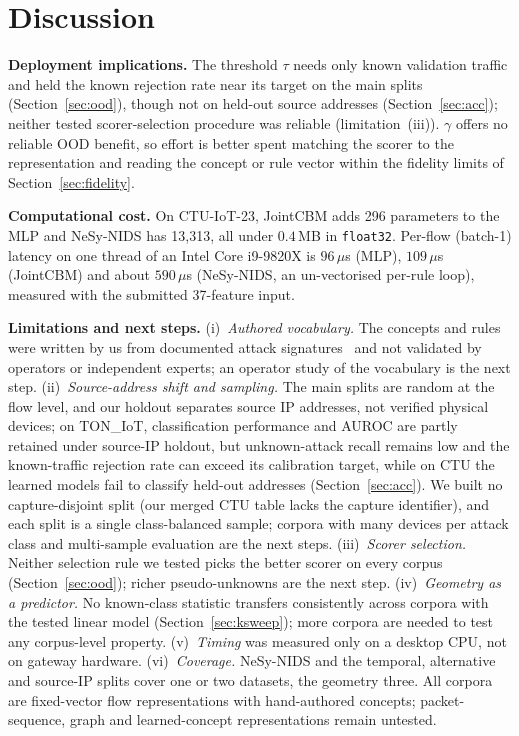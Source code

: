 \documentclass[journal]{IEEEtran}
\begin{document}
\section{Discussion}\label{sec:discussion}

\textbf{Deployment implications.} The threshold $\tau$ needs only known validation traffic and held the known rejection rate near its target on the main splits (Section~\ref{sec:ood}), though not on held-out source addresses (Section~\ref{sec:acc}); neither tested scorer-selection procedure was reliable (limitation~(iii)). $\gamma$ offers no reliable OOD benefit, so effort is better spent matching the scorer to the representation and reading the concept or rule vector within the fidelity limits of Section~\ref{sec:fidelity}.

\label{sec:compute}
\textbf{Computational cost.} On CTU-IoT-23, JointCBM adds 296 parameters to the MLP and NeSy-NIDS has 13{,}313, all under $0.4$\,MB in \texttt{float32}. Per-flow (batch-1) latency on one thread of an Intel Core i9-9820X is $96$\,$\mu$s (MLP), $109$\,$\mu$s (JointCBM) and about $590$\,$\mu$s (NeSy-NIDS, an un-vectorised per-rule loop), measured with the submitted 37-feature input.

\textbf{Limitations and next steps.} (i)~\emph{Authored vocabulary.} The concepts and rules were written by us from documented attack signatures~\cite{mirsky2018kitsune,meidan2018nbaiot} and not validated by operators or independent experts; an operator study of the vocabulary is the next step. (ii)~\emph{Source-address shift and sampling.} The main splits are random at the flow level, and our holdout separates source IP addresses, not verified physical devices; on TON\_IoT, classification performance and AUROC are partly retained under source-IP holdout, but unknown-attack recall remains low and the known-traffic rejection rate can exceed its calibration target, while on CTU the learned models fail to classify held-out addresses (Section~\ref{sec:acc}). We built no capture-disjoint split (our merged CTU table lacks the capture identifier), and each split is a single class-balanced sample; corpora with many devices per attack class and multi-sample evaluation are the next steps. (iii)~\emph{Scorer selection.} Neither selection rule we tested picks the better scorer on every corpus (Section~\ref{sec:ood}); richer pseudo-unknowns are the next step. (iv)~\emph{Geometry as a predictor.} No known-class statistic transfers consistently across corpora with the tested linear model (Section~\ref{sec:ksweep}); more corpora are needed to test any corpus-level property. (v)~\emph{Timing} was measured only on a desktop CPU, not on gateway hardware. (vi)~\emph{Coverage.} NeSy-NIDS and the temporal, alternative and source-IP splits cover one or two datasets, the geometry three. All corpora are fixed-vector flow representations with hand-authored concepts; packet-sequence, graph and learned-concept representations remain untested.
\end{document}
